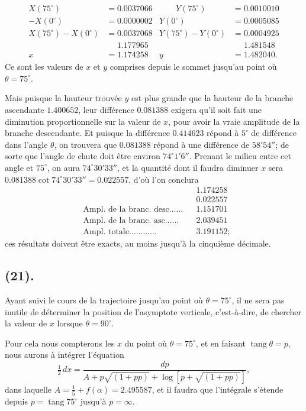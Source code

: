 \documentclass{article}
\begin{document}
\[ \begin{aligned} X(75^{\circ})&=0.0037066 &\qquad Y(75^{\circ})&=0.0010010\\ -X(0^{\circ})&=0.0000002 & Y(0^{\circ})&=0.0005085\\ X(75^{\circ})-X(0^{\circ})&=0.0037068 & Y(75^{\circ})-Y(0^{\circ})&=0.0004925\\ &\phantom{=}1.177965 & &\phantom{=}1.481548\\ x&=1.174258 & y&=1.482040. \end{aligned} \]
Ce sont les valeurs de $x$ et $y$ comprises depuis le sommet jusqu'au point où $\theta=75^{\circ}$.

Mais puisque la hauteur trouvée $y$ est plus grande que la hauteur de la branche ascendante $1.400652$, leur différence $0.081388$ exigera qu'il soit fait une diminution proportionnelle sur la valeur de $x$, pour avoir la vraie amplitude de la branche descendante. Et puisque la différence $0.414623$ répond à $5^{\circ}$ de différence dans l'angle $\theta$, on trouvera que $0.081388$ répond à une différence de $58'54''$; de sorte que l'angle de chute doit être environ $74^{\circ}1'6''$. Prenant le milieu entre cet angle et $75^{\circ}$, on aura $74^{\circ}30'33''$, et la quantité dont il faudra diminuer $x$ sera $0.081388\cot 74^{\circ}30'33''=0.022557$, d'où l'on conclura
\[ \begin{aligned} & && 1.174258\\ & && 0.022557\\ &\text{Ampl. de la branc. desc}\ldots\ldots && 1.151701\\ &\text{Ampl. de la branc. asc}\ldots\ldots && 2.039451\\ &\text{Ampl. totale}\ldots\ldots\ldots\ldots && 3.191152; \end{aligned} \]
ces résultats doivent être exacts, au moins jusqu'à la cinquième décimale.

\subsection*{(21).}

Ayant suivi le cours de la trajectoire jusqu'au point où $\theta=75^{\circ}$, il ne sera pas inutile de déterminer la position de l'asymptote verticale, c'est-à-dire, de chercher la valeur de $x$ lorsque $\theta=90^{\circ}$.

Pour cela nous compterons les $x$ du point où $\theta=75^{\circ}$, et en faisant $\operatorname{tang}\theta=p$, nous aurons à intégrer l'équation
\[ \tfrac{1}{2}\,dx=\frac{dp}{A+p\sqrt{(1+pp)}+\log[p+\sqrt{(1+pp)}]}, \]
dans laquelle $A=\frac{1}{5}+f(\alpha)=2.495587$, et il faudra que l'intégrale s'étende depuis $p=\operatorname{tang}75^{\circ}$ jusqu'à $p=\infty$.
\end{document}
